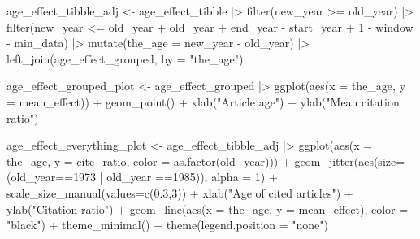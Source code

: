 \documentclass[
  10pt,
  letterpaper,
  DIV=11,
  numbers=noendperiod,
  twoside]{scrartcl}
\newenvironment{Shaded}{\begin{snugshade}}{\end{snugshade}}
\newcommand{\AttributeTok}[1]{\textcolor[rgb]{0.40,0.45,0.13}{#1}}
\newcommand{\DecValTok}[1]{\textcolor[rgb]{0.68,0.00,0.00}{#1}}
\newcommand{\FloatTok}[1]{\textcolor[rgb]{0.68,0.00,0.00}{#1}}
\newcommand{\FunctionTok}[1]{\textcolor[rgb]{0.28,0.35,0.67}{#1}}
\newcommand{\NormalTok}[1]{\textcolor[rgb]{0.00,0.23,0.31}{#1}}
\newcommand{\OtherTok}[1]{\textcolor[rgb]{0.00,0.23,0.31}{#1}}
\newcommand{\SpecialCharTok}[1]{\textcolor[rgb]{0.37,0.37,0.37}{#1}}
\newcommand{\StringTok}[1]{\textcolor[rgb]{0.13,0.47,0.30}{#1}}
\begin{document}
\begin{Shaded}
\begin{Highlighting}[]
\NormalTok{age\_effect\_tibble\_adj }\OtherTok{\textless{}{-}}\NormalTok{ age\_effect\_tibble }\SpecialCharTok{|\textgreater{}}
  \FunctionTok{filter}\NormalTok{(new\_year }\SpecialCharTok{\textgreater{}=}\NormalTok{ old\_year) }\SpecialCharTok{|\textgreater{}}
  \FunctionTok{filter}\NormalTok{(new\_year }\SpecialCharTok{\textless{}=}\NormalTok{ old\_year }\SpecialCharTok{+}\NormalTok{ old\_year }\SpecialCharTok{+}\NormalTok{ end\_year }\SpecialCharTok{{-}}\NormalTok{ start\_year }\SpecialCharTok{+} \DecValTok{1} \SpecialCharTok{{-}}\NormalTok{ window }\SpecialCharTok{{-}}\NormalTok{ min\_data) }\SpecialCharTok{|\textgreater{}}
  \FunctionTok{mutate}\NormalTok{(}\AttributeTok{the\_age =}\NormalTok{ new\_year }\SpecialCharTok{{-}}\NormalTok{ old\_year) }\SpecialCharTok{|\textgreater{}}
  \FunctionTok{left\_join}\NormalTok{(age\_effect\_grouped, }\AttributeTok{by =} \StringTok{"the\_age"}\NormalTok{)}

\NormalTok{age\_effect\_grouped\_plot }\OtherTok{\textless{}{-}}\NormalTok{ age\_effect\_grouped }\SpecialCharTok{|\textgreater{}}
  \FunctionTok{ggplot}\NormalTok{(}\FunctionTok{aes}\NormalTok{(}\AttributeTok{x =}\NormalTok{ the\_age, }\AttributeTok{y =}\NormalTok{ mean\_effect)) }\SpecialCharTok{+}
  \FunctionTok{geom\_point}\NormalTok{() }\SpecialCharTok{+}
  \FunctionTok{xlab}\NormalTok{(}\StringTok{"Article age"}\NormalTok{) }\SpecialCharTok{+}
  \FunctionTok{ylab}\NormalTok{(}\StringTok{"Mean citation ratio"}\NormalTok{)}

\NormalTok{age\_effect\_everything\_plot }\OtherTok{\textless{}{-}}\NormalTok{ age\_effect\_tibble\_adj }\SpecialCharTok{|\textgreater{}}
  \FunctionTok{ggplot}\NormalTok{(}\FunctionTok{aes}\NormalTok{(}\AttributeTok{x =}\NormalTok{ the\_age, }\AttributeTok{y =}\NormalTok{ cite\_ratio, }\AttributeTok{color =} \FunctionTok{as.factor}\NormalTok{(old\_year))) }\SpecialCharTok{+}
  \FunctionTok{geom\_jitter}\NormalTok{(}\FunctionTok{aes}\NormalTok{(}\AttributeTok{size=}\NormalTok{(old\_year}\SpecialCharTok{==}\DecValTok{1973} \SpecialCharTok{|}\NormalTok{ old\_year }\SpecialCharTok{==}\DecValTok{1985}\NormalTok{)), }\AttributeTok{alpha =} \DecValTok{1}\NormalTok{) }\SpecialCharTok{+}
  \FunctionTok{scale\_size\_manual}\NormalTok{(}\AttributeTok{values=}\FunctionTok{c}\NormalTok{(}\FloatTok{0.3}\NormalTok{,}\DecValTok{3}\NormalTok{)) }\SpecialCharTok{+}
  \FunctionTok{xlab}\NormalTok{(}\StringTok{"Age of cited articles"}\NormalTok{) }\SpecialCharTok{+}
  \FunctionTok{ylab}\NormalTok{(}\StringTok{"Citation ratio"}\NormalTok{) }\SpecialCharTok{+}
  \FunctionTok{geom\_line}\NormalTok{(}\FunctionTok{aes}\NormalTok{(}\AttributeTok{x =}\NormalTok{ the\_age, }\AttributeTok{y =}\NormalTok{ mean\_effect), }\AttributeTok{color =} \StringTok{"black"}\NormalTok{) }\SpecialCharTok{+}
  \FunctionTok{theme\_minimal}\NormalTok{() }\SpecialCharTok{+}
  \FunctionTok{theme}\NormalTok{(}\AttributeTok{legend.position =} \StringTok{"none"}\NormalTok{)}
  

\end{Highlighting}
\end{Shaded}
\end{document}
